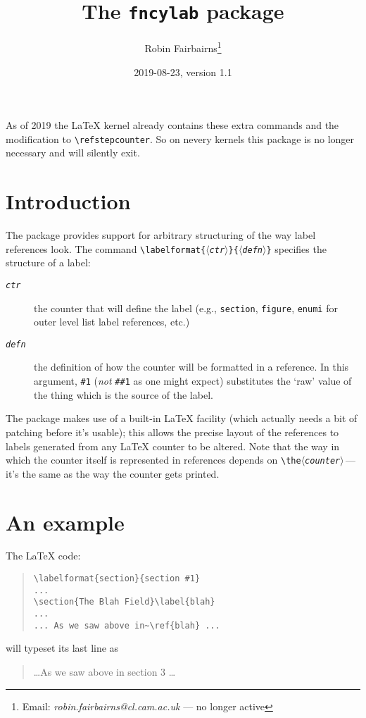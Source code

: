 \documentclass[a4paper]{article}
\newcommand\Package[1]{\texttt{#1}}
\newcommand\cs[1]{\texttt{\textbackslash#1}}
\newcommand\meta[1]{$\langle$\textnormal{\itshape#1}$\rangle$}
\newcommand\marg[1]{\texttt{\{\meta{#1}\}}}
\def\labelformat{} \usepackage{fncylab} %
\begin{document}
\title{The \Package{fncylab} package}
\author{Robin Fairbairns\thanks{Email:
    \emph{robin.fairbairns@cl.cam.ac.uk} --- no longer active}}
\date{2019-08-23, version 1.1}
\maketitle

As of 2019 the \LaTeX{} kernel already contains these extra commands
and the modification to \cs{refstepcounter}. So on nevery kernels
this package is no longer necessary and will silently exit.

\section{Introduction}

The package provides support for arbitrary structuring of the way
label references look.  The command \cs{labelformat}\marg{ctr}\marg{defn}
specifies the structure of a label:
\begin{description}
\item[\emph{\texttt{ctr}}] the counter that will define the label
  (e.g., \texttt{section}, \texttt{figure}, \texttt{enumi} for outer
  level list label references, etc.)
\item[\emph{\texttt{defn}}] the definition of how the counter will be
  formatted in a reference.  In this argument, \texttt{\#1}
  (\emph{not} \texttt{\#\#1} as one might expect) substitutes the
  `raw' value of the thing which is the source of the label.
\end{description}

The package makes use of a built-in LaTeX facility (which actually
needs a bit of patching before it's usable); this allows the precise
layout of the references to labels generated from any LaTeX counter
to be altered.  Note that the way in which the counter itself is
represented in references depends on \cs{the\meta{counter}}\,---\,it's
the same as the way the counter gets printed.

\section{An example}

The \LaTeX{} code:
\begin{quote}
\begin{verbatim}
\labelformat{section}{section #1}
...
\section{The Blah Field}\label{blah}
...
... As we saw above in~\ref{blah} ...
\end{verbatim}
\end{quote}
will typeset its last line as
\begin{quote}
  \dots\@ As we saw above in section 3 \dots
\end{quote}
\end{document}
